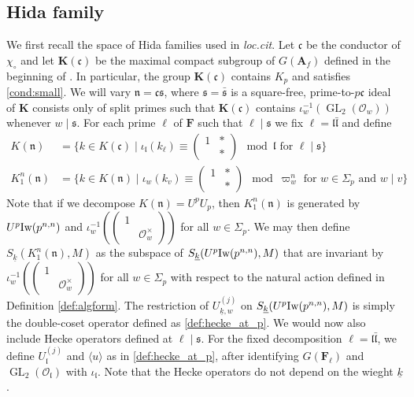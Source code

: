 \documentclass[leqno]{amsart}
\newcommand{\smat}[1]{\left( \begin{smallmatrix} #1 \end{smallmatrix} \right)}
\newcommand{\wt}[1]{\underline{ #1 }}
\newcommand{\Iw}{\textnormal{Iw}}
\DeclareMathOperator{\GL}{GL}
\newcommand{\A}{\mathbf A}
\newcommand{\F}{{\mathbf{F}}} %
\newcommand{\K}{{\mathbf{K}}} %
\newcommand{\oo}{\mathcal{O}} %
\newcommand{\rk}[1]{\K({#1})} %
\newcommand{\fc}{\mathfrak{c}}
\newcommand{\fs}{\mathfrak{s}}
\newcommand{\fn}{\mathfrak{n}}
\newcommand{\fl}{\mathfrak{l}}
\theoremstyle{definition}
\theoremstyle{remark}
\begin{document}
\subsection{Hida family}

We first recall the space of Hida families
used in \textit{loc.cit}.
Let $\fc$ be the conductor of  $\chi_\circ$
and let $\rk{\fc}$ be the maximal compact subgroup
of $G(\A_f)$ defined in the beginning of \cite[\S 6]{lee}.
In particular, the group $\rk{\fc}$ contains $K_p$
and satisfies \eqref{cond:small}.
We will vary $\fn=\fc\fs$,
where $\fs=\bar{\fs}$ is a
square-free, prime-to-$p\fc$
ideal of  $\K$ consists only of split primes
such that  $\rk{\fc}$
contains  $\iota_w^{-1}(\GL_2(\oo_w))$
whenever $w\mid \fs$.
For each prime $\ell$ of $\F$
such that  $\ell\mid \fs$ we 
fix  $\ell=\fl\bar{\fl}$ and define
\begin{align*}
	K(\fn)&=
	\{
	k\in K(\fc)\mid
	\iota_{\fl}(k_\ell)\equiv
	(\begin{smallmatrix}
		1&*\\&*
	\end{smallmatrix})\mod \fl
	\text{ for } \ell\mid \fs
	\}\\
	K_1^n(\fn)&=
	\{
	k\in K(\fn)\mid
	\iota_{w}(k_v)\equiv
	(\begin{smallmatrix}
		1&*\\&*
	\end{smallmatrix})\mod \varpi_w^n
	\text{ for } w\in \Sigma_p
	\text{ and }w\mid v
	\}
\end{align*}
Note that if we decompose $K(\fn)=U^pU_p$,
then $K^n_1(\fn)$ is generated by $U^p\Iw(p^{n,n})$ 
and $\iota_{w}^{-1}(\smat{1&\\&\oo_w^\times})$
for all $w\in \Sigma_p$.
We may then define 
$S_{\wt{k}}(K^n_1(\fn),M)$
as the subspace of 
$S_{\wt{k}}(U^p\Iw(p^{n,n}),M)$
that are invariant by 
$\iota_{w}^{-1}(\smat{1&\\&\oo_w^\times})$
for all $w\in \Sigma_p$
with respect to the natural action
defined in Definition \ref{def:algform}.
The restriction of $U_{\wt{k},w}^{(j)}$
on $S_{\wt{k}}(U^p\Iw(p^{n,n}),M)$
is simply the double-coset operator 
defined as \eqref{def:hecke_at_p}.
We would now also include
Hecke operators defined at $\ell\mid \fs$.
For the fixed decomposition $\ell=\fl\bar{\fl}$,
we define $U_{\fl}^{(j)}$ and $\langle u\rangle$
as in \eqref{def:hecke_at_p},
after identifying $G(\F_\ell)$
and  $\GL_2(\oo_\fl)$ with  $\iota_\fl$.
Note that the Hecke operators 
do not depend on the wieght  $\wt{k}$.
\end{document}
